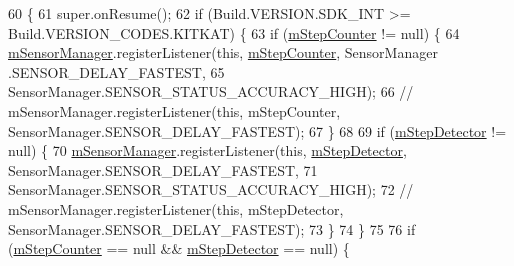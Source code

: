 \begin{DoxyCode}
60                            \{
61         super.onResume();
62         \textcolor{keywordflow}{if} (Build.VERSION.SDK\_INT >= Build.VERSION\_CODES.KITKAT) \{
63             \textcolor{keywordflow}{if} (\hyperlink{classit_1_1unibo_1_1torsello_1_1bluetoothpositioning_1_1fragment_1_1oldFragment_1_1CountPassFragment_afd05ecb723e92fbb3d27bf4978e256bc_afd05ecb723e92fbb3d27bf4978e256bc}{mStepCounter} != null) \{
64                 \hyperlink{classit_1_1unibo_1_1torsello_1_1bluetoothpositioning_1_1fragment_1_1oldFragment_1_1CountPassFragment_a24e4aafb3d377f25aa09024e196d4d8d_a24e4aafb3d377f25aa09024e196d4d8d}{mSensorManager}.registerListener(\textcolor{keyword}{this}, \hyperlink{classit_1_1unibo_1_1torsello_1_1bluetoothpositioning_1_1fragment_1_1oldFragment_1_1CountPassFragment_afd05ecb723e92fbb3d27bf4978e256bc_afd05ecb723e92fbb3d27bf4978e256bc}{mStepCounter}, SensorManager
      .SENSOR\_DELAY\_FASTEST,
65                         SensorManager.SENSOR\_STATUS\_ACCURACY\_HIGH);
66 \textcolor{comment}{//                mSensorManager.registerListener(this, mStepCounter, SensorManager.SENSOR\_DELAY\_FASTEST);}
67             \}
68 
69             \textcolor{keywordflow}{if} (\hyperlink{classit_1_1unibo_1_1torsello_1_1bluetoothpositioning_1_1fragment_1_1oldFragment_1_1CountPassFragment_a83913867971bc949eeff6aa7780cbff2_a83913867971bc949eeff6aa7780cbff2}{mStepDetector} != null) \{
70                 \hyperlink{classit_1_1unibo_1_1torsello_1_1bluetoothpositioning_1_1fragment_1_1oldFragment_1_1CountPassFragment_a24e4aafb3d377f25aa09024e196d4d8d_a24e4aafb3d377f25aa09024e196d4d8d}{mSensorManager}.registerListener(\textcolor{keyword}{this}, 
      \hyperlink{classit_1_1unibo_1_1torsello_1_1bluetoothpositioning_1_1fragment_1_1oldFragment_1_1CountPassFragment_a83913867971bc949eeff6aa7780cbff2_a83913867971bc949eeff6aa7780cbff2}{mStepDetector}, SensorManager.SENSOR\_DELAY\_FASTEST,
71                         SensorManager.SENSOR\_STATUS\_ACCURACY\_HIGH);
72 \textcolor{comment}{//                mSensorManager.registerListener(this, mStepDetector, SensorManager.SENSOR\_DELAY\_FASTEST);}
73             \}
74         \}
75 
76         \textcolor{keywordflow}{if} (\hyperlink{classit_1_1unibo_1_1torsello_1_1bluetoothpositioning_1_1fragment_1_1oldFragment_1_1CountPassFragment_afd05ecb723e92fbb3d27bf4978e256bc_afd05ecb723e92fbb3d27bf4978e256bc}{mStepCounter} == null && \hyperlink{classit_1_1unibo_1_1torsello_1_1bluetoothpositioning_1_1fragment_1_1oldFragment_1_1CountPassFragment_a83913867971bc949eeff6aa7780cbff2_a83913867971bc949eeff6aa7780cbff2}{mStepDetector} == null) \{

\end{DoxyCode}
